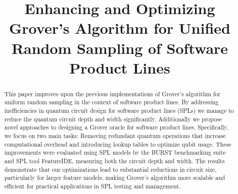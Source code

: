 

\title{Enhancing and Optimizing Grover's Algorithm for Unified Random Sampling of Software Product Lines}

\begin{abstract}
This paper improves upon the previous implementations of Grover's algorithm for uniform random sampling in the context of software product lines.
By addressing inefficiencies in quantum circuit design for software product lines (SPLs) we manage to reduce the quantum circuit depth and width significantly.
Additionally we propose novel approaches to designing a Grover oracle for software product lines.
Specifically, we focus on two main tasks: Removing redundant quantum operations that increase computational overhead and introducing lookup tables to optimize qubit usage. 
These improvements were evaluated using SPL models by the BURST benchmarking suite and SPL tool FeatureIDE, measuring both the circuit depth and width.
The results demonstrate that our optimizations lead to substantial reductions in circuit size, particularly for larger feature models, making Grover's algorithm more scalable and efficient for practical applications in SPL testing and management.
\end{abstract}



\maketitle